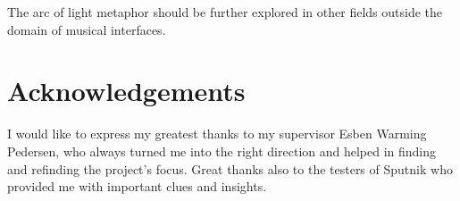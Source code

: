 \documentclass[10pt,a4paper]{scrartcl}
\begin{document}
The arc of light metaphor should be further explored in other fields outside the domain of musical interfaces. 



\section{Acknowledgements}
I would like to express my greatest thanks to my supervisor Esben Warming Pedersen, who always turned me into the right direction and helped in finding and refinding the project's focus. Great thanks also to the testers of Sputnik who provided me with important clues and insights. 



\clearpage


\end{document}
